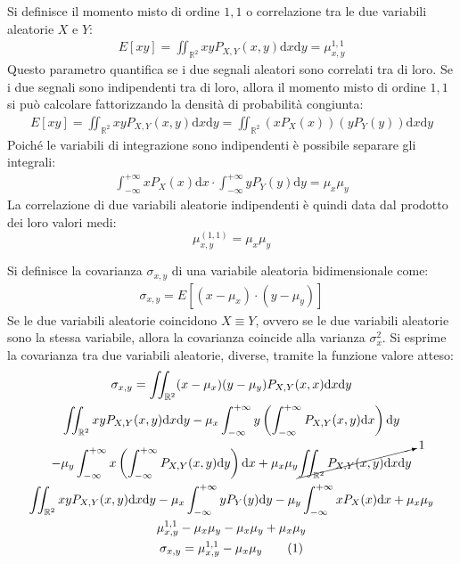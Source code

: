 \documentclass{article}
\newcommand{\df}{\mathrm{d}}
\newcommand{\tageq}{\tag{\stepcounter{equation}\theequation}}
\numberwithin{equation}{subsection}
\begin{document}
Si definisce il momento misto di ordine $1,1$ o correlazione tra le due variabili aleatorie $X$ e $Y$:
\begin{gather}
    E[xy]=\displaystyle\iint_{\mathbb{R}^2}xyP_{X,Y}(x,y)\df x\df y=\mu_{x,y}^{1,1}
\end{gather}
Questo parametro quantifica se i due segnali aleatori sono correlati tra di loro. Se i due segnali sono indipendenti tra di loro, allora il momento misto di ordine $1,1$ si 
può calcolare fattorizzando la densità di probabilità congiunta:
\begin{gather*}
    E[xy]=\displaystyle\iint_{\mathbb{R}^2}xyP_{X,Y}(x,y)\df x\df y=\iint_{\mathbb{R}^2}(xP_X(x))(yP_Y(y))\df x\df y
\end{gather*}
Poiché le variabili di integrazione sono indipendenti è possibile separare gli integrali:
\begin{gather*}
    \displaystyle\int_{-\infty}^{+\infty}xP_X(x)\df x\cdot\int_{-\infty}^{+\infty}yP_Y(y)\df y=\mu_x\mu_y
\end{gather*}
La correlazione di due variabili aleatorie indipendenti è quindi data dal prodotto dei loro valori medi:
\begin{equation}
    \mu_{x,y}^{(1,1)}=\mu_x\mu_y
\end{equation}


Si definisce la covarianza $\sigma_{x,y}$ di una variabile aleatoria bidimensionale come:
\begin{gather*}
    \sigma_{x,y}=E[(x-\mu_x)\cdot(y-\mu_y)]
\end{gather*}
Se le due variabili aleatorie coincidono $X\equiv Y$, ovvero se le due variabili aleatorie sono la stessa variabile, allora la covarianza coincide alla varianza $\sigma_x^2$. 
Si esprime la covarianza tra due variabili aleatorie, diverse, tramite la funzione valore atteso:
\begin{gather*}
    \sigma_{x,y}=\iint_{\mathbb{R}^2}(x-\mu_x)(y-\mu_y)P_{X,Y}(x,x)\df x\df y\\
    \displaystyle\iint_{\mathbb{R}^2}xyP_{X,Y}(x,y)\df x\df y-\mu_x\int_{-\infty}^{+\infty}y\left(\int_{-\infty}^{+\infty}P_{X,Y}(x,y)\df x\right)\df y\\
    -\displaystyle\mu_y\int_{-\infty}^{+\infty}x\left(\int_{-\infty}^{+\infty}P_{X,Y}(x,y)\df y\right)\df x+\mu_x\mu_y\cancelto{1}{\iint_{\mathbb{R}^2}P_{X,Y}(x,y)\df x\df y}\\
    \displaystyle\iint_{\mathbb{R}^2}xyP_{X,Y}(x,y)\df x\df y-\mu_x\int_{-\infty}^{+\infty}yP_Y(y)\df y-\mu_y\int_{-\infty}^{+\infty}xP_X(x)\df x+\mu_x\mu_y\\
    \mu_{x,y}^{1,1}-\mu_x\mu_y-\mu_x\mu_y+\mu_x\mu_y\\
    \sigma_{x,y}=\mu_{x,y}^{1,1}-\mu_x\mu_y\tageq
\end{gather*}
\end{document}
